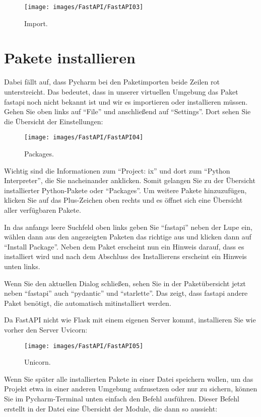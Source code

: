 \begin{figure}
    \texttt{[image: images/FastAPI/FastAPI03]}
    \caption{Import.} \label{FastAPI03}
\end{figure}


\section{Pakete installieren}

Dabei fällt auf, dass Pycharm bei den Paketimporten beide Zeilen rot unterstreicht. Das bedeutet, dass in unserer virtuellen Umgebung das Paket fastapi noch nicht bekannt ist und wir es importieren oder installieren müssen. Gehen Sie oben links auf ``File'' und anschließend auf ``Settings''. Dort sehen Sie die Übersicht der Einstellungen:

\begin{figure}
    \texttt{[image: images/FastAPI/FastAPI04]}
    \caption{Packages.} \label{FastAPI04}
\end{figure}


Wichtig sind die Informationen zum ``Project: ix'' und dort zum ``Python Interpreter'', die Sie nacheinander anklicken. Somit gelangen Sie zu der Übersicht installierter Python-Pakete oder ``Packages''. Um weitere Pakete hinzuzufügen, klicken Sie auf das Plus-Zeichen oben rechts und es öffnet sich eine Übersicht aller verfügbaren Pakete.

In das anfangs leere Suchfeld oben links geben Sie ``fastapi'' neben der Lupe ein, wählen dann aus den angezeigten Paketen das richtige aus und klicken dann auf ``Install Package''. Neben dem Paket erscheint nun ein Hinweis darauf, dass es installiert wird und nach dem Abschluss des Installierens erscheint ein Hinweis unten links.

Wenn Sie den aktuellen Dialog schließen, sehen Sie in der Paketübersicht jetzt neben ``fastapi'' auch ``pydantic'' und ``starlette''. Das zeigt, dass fastapi andere Paket benötigt, die automatisch mitinstalliert werden.

Da FastAPI nicht wie Flask mit einem eigenen Server kommt, installieren Sie wie vorher den Server Uvicorn:

\begin{figure}
    \texttt{[image: images/FastAPI/FastAPI05]}
    \caption{Unicorn.} \label{FastAPI05}
\end{figure}

Wenn Sie später alle installierten Pakete in einer Datei speichern wollen, um das Projekt etwa in einer anderen Umgebung aufzusetzen oder nur zu sichern, können Sie im Pycharm-Terminal unten einfach den Befehl  ausführen. Dieser Befehl erstellt in der Datei  eine Übersicht der Module, die dann so aussieht:

